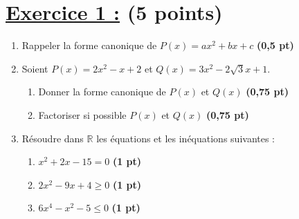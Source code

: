 \documentclass[12pt,a4paper]{article}
\begin{document}
\renewcommand{\arraystretch}{1.5}
\renewcommand{\arrayrulewidth}{1.2pt}
\vspace{3cm}

\section*{\underline{Exercice 1 :} (5 points) }

\begin{enumerate}
    \item Rappeler la forme canonique de $P(x)=ax^2+bx+c$ \hfill \textbf{(0,5 pt)}
    
    \item Soient $P(x)= 2x^2-x+2$ et $Q(x)= 3x^2-2\sqrt{3}x+1$.
    \begin{enumerate}
        \item Donner la forme canonique de $P(x)$ et $Q(x)$ \hfill \textbf{(0,75 pt)}
        \item Factoriser si possible $P(x)$ et $Q(x)$ \hfill \textbf{(0,75 pt)}
    \end{enumerate}

    \item Résoudre dans $\mathbb{R}$ les équations et les inéquations suivantes :
    \begin{enumerate}
        \item $x^2 + 2x - 15 = 0$ \hfill \textbf{(1 pt)}
        \item $2x^2 - 9x + 4 \geq 0$ \hfill \textbf{(1 pt)}
        \item $6x^4 - x^2 - 5 \leq 0$ \hfill \textbf{(1 pt)}
    \end{enumerate}
\end{enumerate}
\end{document}
